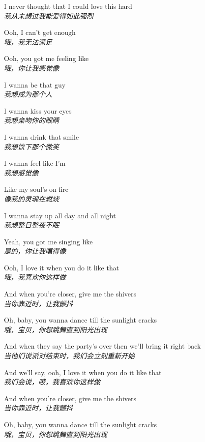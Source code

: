 \begin{spacing}{1.5}
\begin{flushleft}
I never thought that I could love this hard\\
\textit{我从未想过我能爱得如此强烈}\lyricspace

Ooh, I can't get enough\\
\textit{哦，我无法满足}\lyricspace

Ooh, you got me feeling like\\
\textit{哦，你让我感觉像}\lyricspace

I wanna be that guy\\
\textit{我想成为那个人}\lyricspace

I wanna kiss your eyes\\
\textit{我想亲吻你的眼睛}\lyricspace

I wanna drink that smile\\
\textit{我想饮下那个微笑}\lyricspace

I wanna feel like I'm\\
\textit{我想感觉像}\lyricspace

Like my soul's on fire\\
\textit{像我的灵魂在燃烧}\lyricspace

I wanna stay up all day and all night\\
\textit{我想整日整夜不眠}\lyricspace

Yeah, you got me singing like\\
\textit{是的，你让我唱得像}\lyricspace

Ooh, I love it when you do it like that\\
\textit{哦，我喜欢你这样做}\lyricspace

And when you're closer, give me the shivers\\
\textit{当你靠近时，让我颤抖}\lyricspace

Oh, baby, you wanna dance till the sunlight cracks\\
\textit{哦，宝贝，你想跳舞直到阳光出现}\lyricspace

And when they say the party's over then we'll bring it right back\\
\textit{当他们说派对结束时，我们会立刻重新开始}\lyricspace

And we'll say, ooh, I love it when you do it like that\\
\textit{我们会说，哦，我喜欢你这样做}\lyricspace

And when you're closer, give me the shivers\\
\textit{当你靠近时，让我颤抖}\lyricspace

Oh, baby, you wanna dance till the sunlight cracks\\
\textit{哦，宝贝，你想跳舞直到阳光出现}\lyricspace


\end{flushleft}
\end{spacing}
